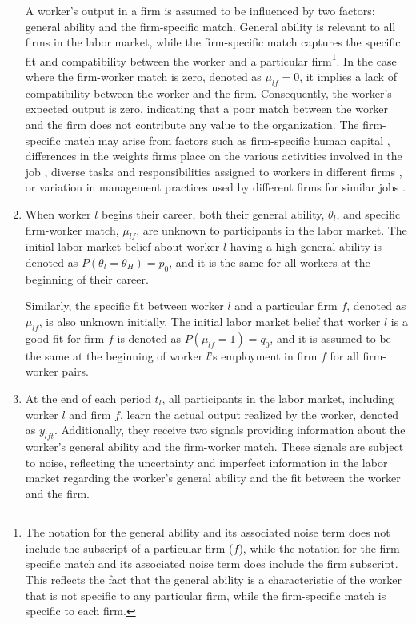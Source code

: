 \documentclass[12pt]{article}
\begin{document}
\begin{enumerate}[label={A}{\arabic*}.]
    A worker's output in a firm is assumed to be influenced by two factors: general ability and the firm-specific match. General ability is relevant to all firms in the labor market, while the firm-specific match captures the specific fit and compatibility between the worker and a particular firm\footnote{The notation for the general ability and its associated noise term does not include the subscript of a particular firm ($f$), while the notation for the firm-specific match and its associated noise term does include the firm subscript. This reflects the fact that the general ability is a characteristic of the worker that is not specific to any particular firm, while the firm-specific match is specific to each firm.}. In the case where the firm-worker match is zero, denoted as $\mu_{lf} = 0$, it implies a lack of compatibility between the worker and the firm. Consequently, the worker's expected output is zero, indicating that a poor match between the worker and the firm does not contribute any value to the organization. The firm-specific match may arise from factors such as firm-specific human capital \citep{becker1962investment, becker1975investment}, differences in the weights firms place on the various activities involved in the job \citep{lazear2009firm}, diverse tasks and responsibilities assigned to workers in different firms \citep{gibbons2004task}, or variation in management practices used by different firms for similar jobs \citep{bloom2019drives, dessein2022organizational}.

    \item When worker $l$ begins their career, both their general ability, $\theta_l$, and specific firm-worker match, $\mu_{lf}$, are unknown to participants in the labor market. The initial labor market belief about worker $l$ having a high general ability is denoted as $P(\theta_l = \theta_H) = p_0$, and it is the same for all workers at the beginning of their career.

    Similarly, the specific fit between worker $l$ and a particular firm $f$, denoted as $\mu_{lf}$, is also unknown initially. The initial labor market belief that worker $l$ is a good fit for firm $f$ is denoted as $P(\mu_{lf} = 1) = q_0$, and it is assumed to be the same at the beginning of worker $l$'s employment in firm $f$ for all firm-worker pairs.

    \item At the end of each period $t_l$, all participants in the labor market, including worker $l$ and firm $f$, learn the actual output realized by the worker, denoted as $y_{lft}$. Additionally, they receive two signals providing information about the worker's general ability and the firm-worker match. These signals are subject to noise, reflecting the uncertainty and imperfect information in the labor market regarding the worker's general ability and the fit between the worker and the firm.


\end{enumerate}
\end{document}
